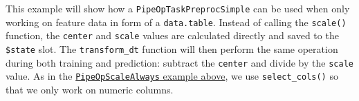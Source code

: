 \documentclass[]{scrbook}
\newenvironment{Shaded}{\begin{snugshade}}{\end{snugshade}}
\newcommand{\ControlFlowTok}[1]{\textcolor[rgb]{0.13,0.29,0.53}{\textbf{#1}}}
\newcommand{\DataTypeTok}[1]{\textcolor[rgb]{0.13,0.29,0.53}{#1}}
\newcommand{\KeywordTok}[1]{\textcolor[rgb]{0.13,0.29,0.53}{\textbf{#1}}}
\newcommand{\NormalTok}[1]{#1}
\newcommand{\OperatorTok}[1]{\textcolor[rgb]{0.81,0.36,0.00}{\textbf{#1}}}
\newcommand{\StringTok}[1]{\textcolor[rgb]{0.31,0.60,0.02}{#1}}
\renewenvironment{Shaded} {\begin{snugshade}\small} {\end{snugshade}}
\begin{document}
This example will show how a \texttt{PipeOpTaskPreprocSimple} can be used when only working on feature data in form of a \texttt{data.table}.
Instead of calling the \texttt{scale()} function, the \texttt{center} and \texttt{scale} values are calculated directly and saved to the \texttt{\$state} slot.
The \texttt{transform\_dt} function will then perform the same operation during both training and prediction: subtract the \texttt{center} and divide by the \texttt{scale} value.
As in the \protect\hyperlink{example-pipeopscalealways}{\texttt{PipeOpScaleAlways} example above}, we use \texttt{select\_cols()} so that we only work on numeric columns.

\begin{Shaded}
\end{Shaded}
\end{document}
